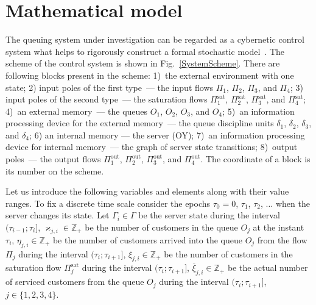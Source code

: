 \documentclass[10pt]{article}
\begin{document}
\section{Mathematical model}
The queuing system under investigation can be regarded as a cybernetic control system what helps to
rigorously construct a formal stochastic model~\cite{z:2012}. The scheme of the control system is
shown in Fig.~\ref{SystemScheme}. There are following blocks present in the scheme: 1)~the external
environment with one state; 2) input poles of the first type~--- the input flows $\Pi_1$, $\Pi_2$,
$\Pi_3$, and $\Pi_4$; 3) input poles of the second type~--- the saturation flows
$\Pi^{\mathrm{\text{sat}}}_1$, $\Pi^{\mathrm{\text{sat}}}_2$, $\Pi^{\mathrm{\text{sat}}}_3$, and
$\Pi^{\mathrm{\text{sat}}}_4$; 4)~an external memory~--- the queues $O_1$, $O_2$, $O_3$, and $O_4$;
5)~an information processing device for the external memory~--- the queue discipline units
$\delta_1$, $\delta_2$, $\delta_3$, and $\delta_4$; 6) an internal memory --- the server (OY); 7)~an
information processing device for internal memory~--- the graph of server state transitions;
8)~output poles~--- the output flows $\Pi^{\mathrm{\text{out}}}_1$, $\Pi^{\mathrm{\text{out}}}_2$,
$\Pi^{\mathrm{\text{out}}}_3$, and $\Pi^{\mathrm{\text{out}}}_4$.  The coordinate of a block is
its number on the scheme.

Let us  introduce the following variables and elements along with their
value ranges. To fix a discrete time scale consider the epochs $\tau_0=0$, $\tau_1$, $\tau_2$,
$\ldots$ when the server changes its state. Let $\Gamma_i\in\Gamma$ be the server state
during the interval $(\tau_{i-1};\tau_i]$, $\varkappa_{j,i} \in \mathbb{Z}_+ $ be the number of customers in
the queue $O_j$ at the instant $\tau_i$, $\eta_{j,i} \in \mathbb{Z}_+$ be the number of customers
arrived into the queue $O_j$ from the flow $\Pi_j$ during the interval $(\tau_{i};\tau_{i+1}]$, $\xi_{j,i} \in
\mathbb{Z}_+$ be the number of customers in the saturation flow $\Pi^{\mathrm{\text{sat}}}_j$ during
the interval $(\tau_{i};\tau_{i+1}]$, $\overline{\xi}_{j,i}\in \mathbb{Z}_+$ be the actual number of 
serviced customers from the queue  $O_j$ during the interval $(\tau_{i};\tau_{i+1}]$, $j\in
\{1,2,3,4\}$.
\end{document}
